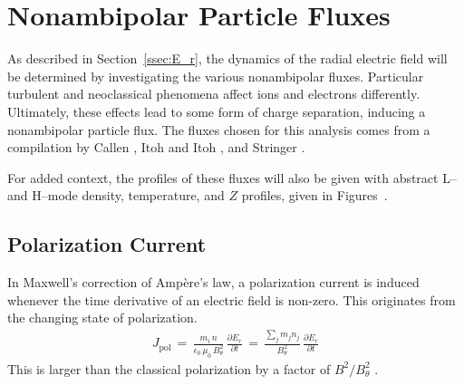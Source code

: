 \section{Nonambipolar Particle Fluxes}\label{sec:nonambipolar_fluxes}
As described in Section~\ref{ssec:E_r}, the dynamics of the radial electric field will be determined by investigating the various nonambipolar fluxes.
Particular turbulent and neoclassical phenomena affect ions and electrons differently.
Ultimately, these effects lead to some form of charge separation, inducing a nonambipolar particle flux.
The fluxes chosen for this analysis comes from a compilation by Callen \cite{callen_toroidal_2009}, Itoh and Itoh \cite{itoh_role_1996}, and Stringer \cite{stringer_explanation_1993}.

For added context, the profiles of these fluxes will also be given with abstract L-- and H--mode density, temperature, and $Z$ profiles, given in Figures~.


\subsection{Polarization Current}\label{ssec:polarization_current}
In Maxwell's correction of Amp\`ere's law, a polarization current is induced whenever the time derivative of an electric field is non-zero.
This originates from the changing state of polarization.
\begin{align} %
	J_\text{pol} \,=\, \frac{m_i \, n}{\epsilon_0\,\mu_0 \, B_\theta^2} \, \frac{\partial E_r}{\partial t}
		\,=\, \frac{\sum_j m_j n_j}{B_\theta^2} \, \frac{\partial E_r}{\partial t}
		\label{eq:polarization_current_original}
\end{align}
This is larger than the classical polarization by a factor of $B^2 / B_\theta^2$ \cite{hinton_neoclassical_1984}.


